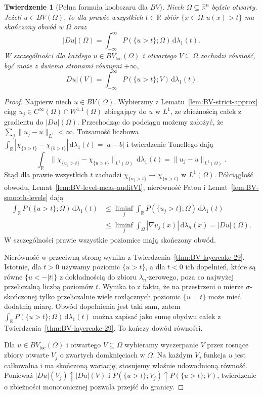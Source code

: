 \documentclass[11pt,a4paper,oneside]{book}
\numberwithin{equation}{chapter}
\theoremstyle{plain}
\newtheorem{twierdzenie}{Twierdzenie}[chapter]
\theoremstyle{definition}
\theoremstyle{remark}
\begin{document}
\begin{twierdzenie}[Pełna formuła koobszaru dla $BV$]
\label{thm:BV-coarea-full-29}
Niech $\Omega\subseteq\mathbb R^n$ będzie otwarty.
Jeżeli $u\in BV(\Omega)$, to dla prawie wszystkich
$t\in\mathbb R$ zbiór $\{x\in\Omega:u(x)>t\}$
ma skończony obwód w $\Omega$ oraz
\begin{equation}\label{eq:BV-coarea-full-29}
 |Du|(\Omega)=\int_{-\infty}^{\infty}
 P(\{u>t\};\Omega)\,\mathrm d\lambda_1(t).
\end{equation}
W szczególności dla każdego $u\in BV_{\mathrm{loc}}(\Omega)$
i otwartego $V\subseteq\Omega$ zachodzi równość,
być może z dwiema stronami równymi $+\infty$,
\[
 |Du|(V)=\int_{-\infty}^{\infty}
 P(\{u>t\};V)\,\mathrm d\lambda_1(t).
\]
\end{twierdzenie}
\begin{proof}
Najpierw niech $u\in BV(\Omega)$.
Wybierzmy z Lematu~\ref{lem:BV-strict-approx}
ciąg $u_j\in C^\infty(\Omega)\cap W^{1,1}(\Omega)$
zbiegający do $u$ w $L^1$, ze zbieżnością
całek z gradientu do $|Du|(\Omega)$.
Przechodząc do podciągu możemy założyć,
że $\sum_j\|u_j-u\|_{L^1}<\infty$.
Tożsamość liczbowa
$\int_{\mathbb R}|\chi_{\{a>t\}}-
\chi_{\{b>t\}}|\,\mathrm d\lambda_1(t)=|a-b|$
i twierdzenie Tonellego dają
\[
 \int_{\mathbb R}\|\chi_{\{u_j>t\}}-
 \chi_{\{u>t\}}\|_{L^1(\Omega)}
 \,\mathrm d\lambda_1(t)=\|u_j-u\|_{L^1(\Omega)}.
\]
Stąd dla prawie wszystkich $t$ zachodzi
$\chi_{\{u_j>t\}}\to\chi_{\{u>t\}}$
w $L^1(\Omega)$. Półciągłość obwodu,
Lemat~\ref{lem:BV-level-meas-auditVI},
nierówność Fatou i Lemat~\ref{lem:BV-smooth-levels}
dają
\begin{align*}
 \int_{\mathbb R}P(\{u>t\};\Omega)\,
 \mathrm d\lambda_1(t)
 &\le\liminf_j\int_{\mathbb R}
 P(\{u_j>t\};\Omega)\,\mathrm d\lambda_1(t)\\
 &\le\liminf_j\int_\Omega|\nabla u_j(x)|
 \,\mathrm d\lambda_n(x)=|Du|(\Omega).
\end{align*}
W szczególności prawie wszystkie poziomice
mają skończony obwód.

Nierówność w przeciwną stronę wynika z
Twierdzenia~\ref{thm:BV-layercake-29}.
Istotnie, dla $t>0$ używamy poziomic $\{u>t\}$,
a dla $t<0$ ich dopełnień, które są równe
$\{u<-|t|\}$ z dokładnością do zbioru
$\lambda_n$-zerowego, poza co najwyżej
przeliczalną liczbą poziomów $t$.
Wynika to z faktu, że na przestrzeni o mierze
$\sigma$-skończonej tylko przeliczalnie
wiele rozłącznych poziomic $\{u=t\}$ może
mieć dodatnią miarę. Obwód dopełnienia jest
taki sam, zatem
$\int_{\mathbb R}P(\{u>t\};\Omega)\,\mathrm d\lambda_1(t)$
można zapisać jako sumę obydwu całek
z Twierdzenia~\ref{thm:BV-layercake-29}.
To kończy dowód równości.

Dla $u\in BV_{\mathrm{loc}}(\Omega)$ i otwartego
$V\subseteq\Omega$ wybieramy wyczerpanie $V$
przez rosnące zbiory otwarte $V_j$ o zwartych
domknięciach w $\Omega$. Na każdym $V_j$
funkcja $u$ jest całkowalna i ma skończoną
wariację; stosujemy właśnie udowodnioną równość.
Ponieważ $|Du|(V_j)\uparrow|Du|(V)$
i $P(\{u>t\};V_j)\uparrow P(\{u>t\};V)$,
twierdzenie o zbieżności monotonicznej pozwala
przejść do granicy.
\end{proof}
\end{document}
